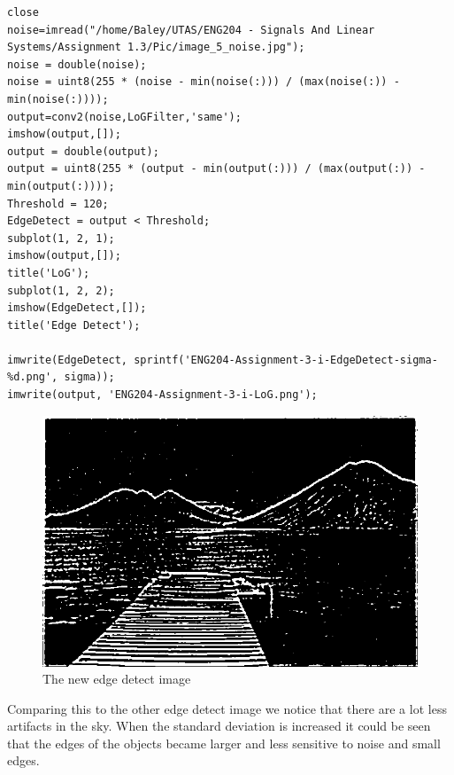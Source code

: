 \documentclass[11pt]{article}
\begin{document}
\begin{verbatim}
close
noise=imread("/home/Baley/UTAS/ENG204 - Signals And Linear Systems/Assignment 1.3/Pic/image_5_noise.jpg");
noise = double(noise);
noise = uint8(255 * (noise - min(noise(:))) / (max(noise(:)) - min(noise(:))));
output=conv2(noise,LoGFilter,'same');
imshow(output,[]);
output = double(output);
output = uint8(255 * (output - min(output(:))) / (max(output(:)) - min(output(:))));
Threshold = 120;
EdgeDetect = output < Threshold;
subplot(1, 2, 1);
imshow(output,[]);
title('LoG');
subplot(1, 2, 2);
imshow(EdgeDetect,[]);
title('Edge Detect');

imwrite(EdgeDetect, sprintf('ENG204-Assignment-3-i-EdgeDetect-sigma-%d.png', sigma));
imwrite(output, 'ENG204-Assignment-3-i-LoG.png');
\end{verbatim}
\begin{FIGURE}
\begin{figure}[htbp]
\centering
\includegraphics[width=.9\linewidth]{ENG204-Assignment-3-i-EdgeDetect-sigma-2.png}
\caption{The new edge detect image}
\end{figure}
\end{FIGURE}
Comparing this to the other edge detect image we notice that there are a lot less artifacts in the sky. When the standard deviation is increased it could be seen that the edges of the objects became larger and less sensitive to noise and small edges.
\end{document}
